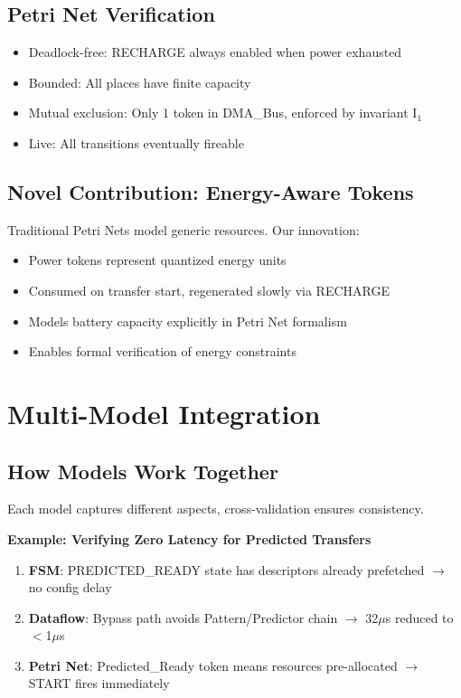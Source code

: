 \documentclass[conference]{IEEEtran}
\newcommand{\cmark}{\ding{51}}%
\begin{document}
\subsection{Petri Net Verification}
\begin{itemize}
    \item[\cmark] Deadlock-free: RECHARGE always enabled when power exhausted
    \item[\cmark] Bounded: All places have finite capacity
    \item[\cmark] Mutual exclusion: Only 1 token in DMA\_Bus, enforced by invariant I$_1$
    \item[\cmark] Live: All transitions eventually fireable
\end{itemize}

\subsection{Novel Contribution: Energy-Aware Tokens}
Traditional Petri Nets model generic resources. Our innovation:
\begin{itemize}
    \item Power tokens represent quantized energy units
    \item Consumed on transfer start, regenerated slowly via RECHARGE
    \item Models battery capacity explicitly in Petri Net formalism
    \item Enables formal verification of energy constraints
\end{itemize}

\section{Multi-Model Integration}

\subsection{How Models Work Together}
Each model captures different aspects, cross-validation ensures consistency.

\textbf{Example: Verifying Zero Latency for Predicted Transfers}
\begin{enumerate}
    \item \textbf{FSM}: PREDICTED\_READY state has descriptors already prefetched $\rightarrow$ no config delay \cmark
    \item \textbf{Dataflow}: Bypass path avoids Pattern/Predictor chain $\rightarrow$ 32$\mu$s reduced to $<$1$\mu$s \cmark
    \item \textbf{Petri Net}: Predicted\_Ready token means resources pre-allocated $\rightarrow$ START fires immediately \cmark
\end{enumerate}
\end{document}
